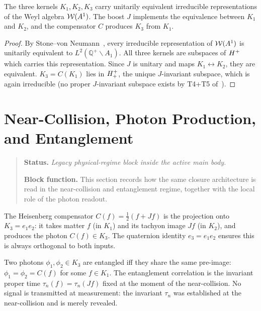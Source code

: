 \begin{theorem}\label{thm:unitary-equiv}
The three kernels $K_1,K_2,K_3$ carry unitarily equivalent
irreducible representations of the Weyl algebra $\mathcal{W}(A^1)$.
The boost $J$ implements the equivalence between $K_1$ and $K_2$,
and the compensator $C$ produces $K_3$ from $K_1$.
\end{theorem}

\begin{proof}
By Stone--von Neumann~\cite{brendecke2026rh}, every irreducible
representation of $\mathcal{W}(A^1)$ is unitarily equivalent to $L^2(\mathbb{Q}^+\backslash A_1)$.
All three kernels are subspaces of $H^+$ which carries this
representation.
Since $J$ is unitary and maps $K_1\leftrightarrow K_2$, they are
equivalent.
$K_3=C(K_1)$ lies in $H^+_+$, the unique $J$-invariant subspace,
which is again irreducible (no proper $J$-invariant subspace exists by
T4+T5 of~\cite{brendecke2026rh}).
\end{proof}


\section{Near-Collision, Photon Production, and Entanglement}
\begin{quote}\small
\noindent\textbf{Status.} \emph{Legacy physical-regime block inside the active main body.}\par
\noindent\textbf{Block function.} This section records how the same closure architecture is read in the near-collision and entanglement regime, together with the local role of the photon readout.
\end{quote}
\label{sec:entanglement}

\begin{proposition}\label{prop:compensator}
The Heisenberg compensator $C(f)=\tfrac{1}{2}(f+Jf)$ is the projection
onto $K_3=e_1 e_2$: it takes matter $f$ (in $K_1$) and its tachyon image
$Jf$ (in $K_2$), and produces the photon $C(f)\in K_3$.
The quaternion identity $e_3=e_1 e_2$ ensures this is always orthogonal
to both inputs.
\end{proposition}

\begin{theorem}
\label{thm:entanglement-shared-time}
Two photons $\phi_1,\phi_2\in K_3$ are entangled iff they share the same
pre-image: $\phi_1=\phi_2=C(f)$ for some $f\in K_1$.
The entanglement correlation is the invariant proper time
$\tau_n(f)=\tau_n(Jf)$ fixed at the moment of the near-collision.
No signal is transmitted at measurement: the invariant $\tau_n$ was
established at the near-collision and is merely revealed.
\end{theorem}

